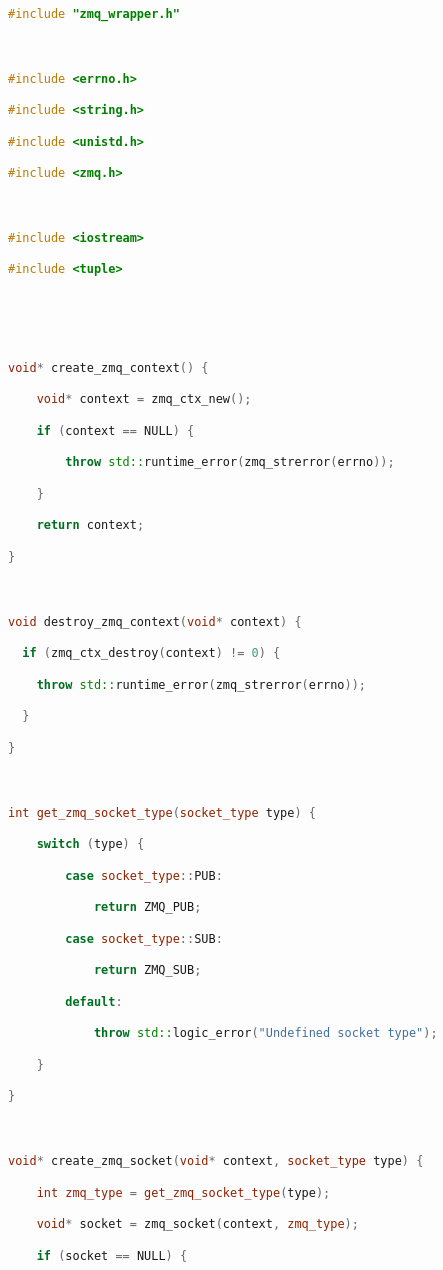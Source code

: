 \begin{lstlisting}[language=C++]

#include "zmq_wrapper.h"



#include <errno.h>

#include <string.h>

#include <unistd.h>

#include <zmq.h>



#include <iostream>

#include <tuple>





void* create_zmq_context() {

    void* context = zmq_ctx_new();

    if (context == NULL) {

        throw std::runtime_error(zmq_strerror(errno));

    }

    return context;

}



void destroy_zmq_context(void* context) {

  if (zmq_ctx_destroy(context) != 0) {

    throw std::runtime_error(zmq_strerror(errno));

  }

}



int get_zmq_socket_type(socket_type type) {

    switch (type) {

        case socket_type::PUB:

            return ZMQ_PUB;

        case socket_type::SUB:

            return ZMQ_SUB;

        default:

            throw std::logic_error("Undefined socket type");

    }

}



void* create_zmq_socket(void* context, socket_type type) {

    int zmq_type = get_zmq_socket_type(type);

    void* socket = zmq_socket(context, zmq_type);

    if (socket == NULL) {


\end{lstlisting}
